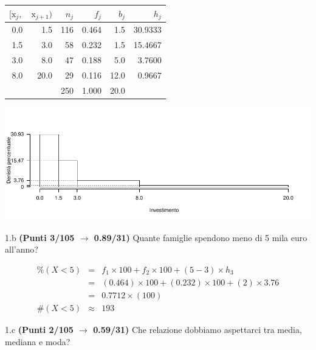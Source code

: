 \documentclass[
  11pt,
]{book}
\theoremstyle{mytheoremstyle}
\theoremstyle{mydefstyle}
\newenvironment{sol}
  {
  \begin{tcolorbox}[enhanced,breakable,arc=0.1mm,boxrule=1pt,colback=white,colframe=iblue,
  title=\bf \fontfamily{lmss}\selectfont \hspace{.5 cm} Soluzione,drop fuzzy shadow]

}{
\end{tcolorbox}
  }
\begin{document}
\begin{sol}

\begin{table}[H]
\centering
\begin{tabular}{rrrrrr}
\toprule
$[\text{x}_j,$ & $\text{x}_{j+1})$ & $n_j$ & $f_j$ & $b_j$ & $h_j$\\
\midrule
0.0 & 1.5 & 116 & 0.464 & 1.5 & 30.9333\\
1.5 & 3.0 & 58 & 0.232 & 1.5 & 15.4667\\
3.0 & 8.0 & 47 & 0.188 & 5.0 & 3.7600\\
8.0 & 20.0 & 29 & 0.116 & 12.0 & 0.9667\\
 &  & 250 & 1.000 & 20.0 & \\
\bottomrule
\end{tabular}
\end{table}

\begin{center}\includegraphics{Esami_passati_con_soluzioni_files/figure-latex/2024-73-1} \end{center}

\end{sol}

1.b \textbf{(Punti 3/105 \(\rightarrow\) 0.89/31)} Quante famiglie spendono meno di 5 mila euro all'anno?

\begin{sol}
\begin{eqnarray*}
     \%(X< 5 ) &=&  f_{ 1 }\times 100+f_{ 2 }\times 100 +( 5 - 3 )\times h_{ 3 } \\
              &=&  ( 0.464 )\times 100+( 0.232 )\times 100 +( 2 )\times  3.76  \\
              &=&  0.7712 \times(100) \\
     \#(X< 5 ) &\approx& 193 
         \end{eqnarray*}

\end{sol}

1.c \textbf{(Punti 2/105 \(\rightarrow\) 0.59/31)} Che relazione dobbiamo aspettarci tra media, mediana e moda?
\end{document}
